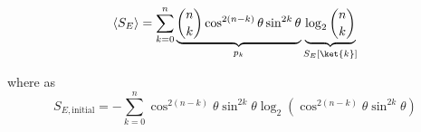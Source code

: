 
$$
\langle S_E \rangle = \sum_{k=0}^n \underbrace{\binom{n}{k} \cos^{2(n-k)}\theta \sin^{2k}\theta}_{p_k}
 \underbrace{\log_2 \binom{n}{k}}_{S_E[\ket{k}]}
$$

where as 
$$
S_{E,\text{initial}} = -\sum_{k=0}^n \cos^{2(n-k)}\theta \sin^{2k}\theta \log_2\left(\cos^{2(n-k)}\theta \sin^{2k}\theta  \right)
$$